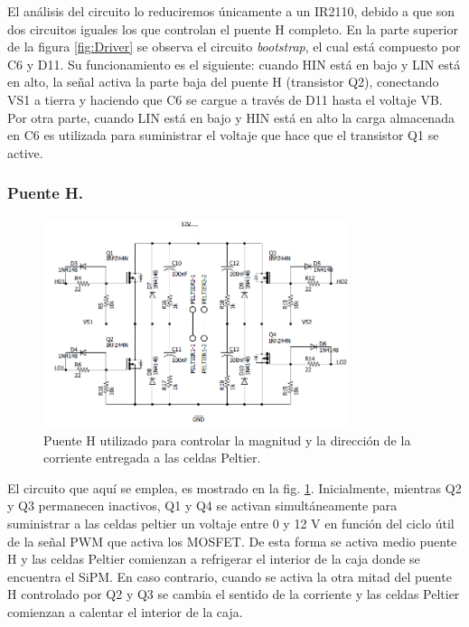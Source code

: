 El análisis del circuito  lo reduciremos únicamente a un IR2110, debido a que son dos circuitos iguales los que controlan el puente H completo. En la parte superior de la figura \ref{fig:Driver} se observa el circuito \textit{bootstrap}, el cual está compuesto por C6 y D11. Su funcionamiento es el siguiente: cuando HIN está en bajo y LIN está en alto, la señal activa la parte baja del puente H (transistor Q2), conectando VS1 a tierra y haciendo que C6 se cargue a través de D11 hasta el voltaje VB. Por otra parte, cuando LIN está en bajo y HIN está en alto la carga almacenada en C6 es utilizada para suministrar el voltaje que hace que el transistor Q1 se active.\\
\subsubsection{Puente H.}
\begin{figure}[h!]
\begin{centering}
  \includegraphics[width=0.8\textwidth]{Images/PuenteH.png}
    \caption{Puente H utilizado para controlar la magnitud y la  dirección de la corriente entregada a las celdas Peltier.}
    \label{fig:PuenteH}
  \par\end{centering}
\end{figure}
El circuito que aquí se emplea, es mostrado en la fig.  \ref{fig:PuenteH}. Inicialmente, mientras Q2  y Q3 permanecen inactivos, Q1 y Q4 se activan simultáneamente para suministrar a las celdas peltier un voltaje entre 0 y 12 V en función del ciclo útil de la señal PWM que activa los MOSFET. De esta forma se activa medio puente H y las celdas Peltier comienzan a refrigerar el interior de la caja donde se encuentra el SiPM. En caso contrario, cuando se activa la otra mitad del puente H controlado por Q2 y Q3 se cambia el sentido de la corriente y las celdas Peltier comienzan a calentar el interior de la caja.\\ \\
